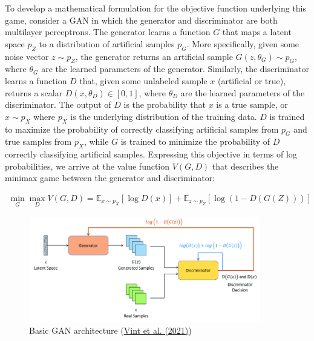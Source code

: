 \documentclass[submission]{eptcs}
\begin{document}
To develop a mathematical formulation for the objective function underlying this game, consider a GAN in which the generator and discriminator are both multilayer perceptrons. The generator learns a function $G$ that maps a latent space $p_Z$ to a distribution of artificial samples $p_G$. More specifically, given some noise vector $z \sim p_Z$, the generator returns an artificial sample $G(z, \theta_G) \sim p_G$, where $\theta_G$ are the learned parameters of the generator. Similarly, the discriminator learns a function $D$ that, given some unlabeled sample $x$ (artificial or true), returns a scalar $D(x, \theta_D) \in [0, 1]$, where $\theta_D$ are the learned parameters of the discriminator. The output of $D$ is the probability that $x$ is a true sample, or $x \sim p_X$ where $p_X$ is the underlying distribution of the training data. $D$ is trained to maximize the probability of correctly classifying artificial samples from $p_G$ and true samples from $p_X$, while $G$ is trained to minimize the probability of $D$ correctly classifying artificial samples. Expressing this objective in terms of log probabilities, we arrive at the value function $V(G, D)$ that describes the minimax game between the generator and discriminator:

\begin{align}
    \min_G \max_D V(G, D) = \mathbb{E}_{x \sim p_X} [\log D(x)] + \mathbb{E}_{z \sim p_Z} [\log(1 - D(G(Z)))]
\end{align}

\begin{figure}[H]
    \begin{center}
        \includegraphics*[width = 0.9\textwidth]{gan_architecture.png}
        \caption{Basic GAN architecture (\href{https://www.researchgate.net/publication/349182009_Automatic_Target_Recognition_for_Low_Resolution_Foliage_Penetrating_SAR_Images_Using_CNNs_and_GANs}{Vint et al. (2021)})}
    \end{center}
\end{figure}
\end{document}
